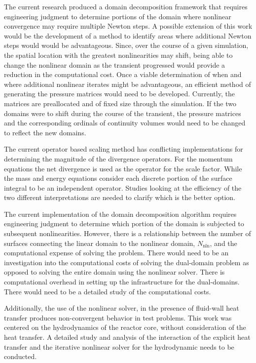 The current research produced a domain decomposition framework that requires engineering judgment to determine portions of the domain where nonlinear convergence may require multiple Newton steps.
A possible extension of this work would be the development of a method to identify areas where additional Newton steps would would be advantageous.
Since, over the course of a given simulation, the spatial location with the greatest nonlinearities may shift, being able to change the nonlinear domain as the transient progressed would provide a reduction in the computational cost.
Once a viable determination of when and where additional nonlinear iterates might be advantageous, an efficient method of generating the pressure matrices would need to be developed.
Currently, the matrices are preallocated and of fixed size through the simulation.
If the two domains were to shift during the course of the transient, the pressure matrices and the corresponding ordinals of continuity volumes would need to be changed to reflect the new domains.

The current operator based scaling method has conflicting implementations for determining the magnitude of the divergence operators.
For the momentum equations the net divergence is used as the operator for the scale factor.
While the mass and energy equations consider each discrete portion of the surface integral to be an independent operator.
Studies looking at the efficiency of the two different interpretations are needed to clarify which is the better option.

The current implementation of the domain decomposition algorithm requires engineering judgment to determine which portion of the domain is subjected to subsequent nonlinearities.
However, there is a relationship between the number of surfaces connecting the linear domain to the nonlinear domain, $N_{\text{nln}}$, and the computational expense of solving the problem.
There would need to be an investigation into the computational costs of solving the dual-domain problem as opposed to solving the entire domain using the nonlinear solver.
There is computational overhead in setting up the infrastructure for the dual-domains.
There would need to be a detailed study of the computational costs.

Additionally, the use of the nonlinear solver, in the presence of fluid-wall heat transfer produces non-convergent behavior in test problems.
This work was centered on the hydrodynamics of the reactor core, without consideration of the heat transfer.
A detailed study and analysis of the interaction of the explicit heat transfer and the iterative nonlinear solver for the hydrodynamic needs to be conducted.

